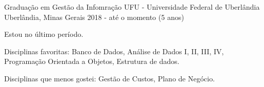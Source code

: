 \cventry
    {Graduação em Gestão da Infomração}
    {UFU - Universidade Federal de Uberlândia}
    {Uberlândia, Minas Gerais}
    {2018 - até o momento (5 anos)}
    {
        \begin{cvitems}
            \item {Estou no último período.}
            \item {Disciplinas favoritas: Banco de Dados, Análise de Dados I, II, III, IV, Programação Orientada a Objetos, Estrutura de dados.}
            \item {Disciplinas que menos gostei: Gestão de Custos, Plano de Negócio.}
        \end{cvitems}
    }